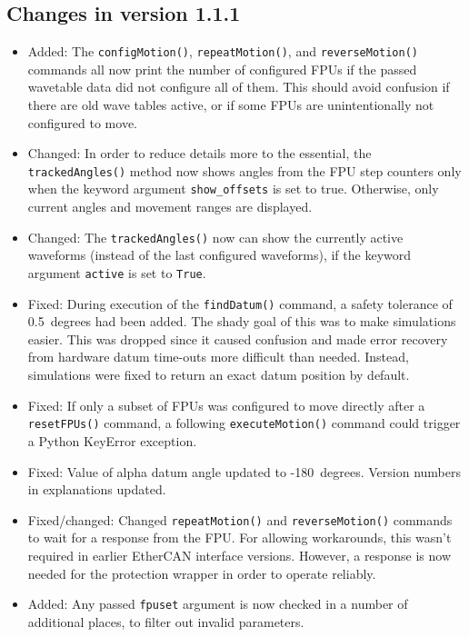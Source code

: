 \documentclass[11pt,a4paper]{report}
\begin{document}
\subsection*{Changes in version 1.1.1}
\begin{itemize}
\item Added: The \texttt{configMotion()}, \texttt{repeatMotion()}, and
  \texttt{reverseMotion()} commands all now print the number of
  configured FPUs if the passed wavetable data did not configure all
  of them. This should avoid confusion if there are old wave tables
  active, or if some FPUs are unintentionally not configured to move.

\item Changed: In order to reduce details more to the essential, the
  \texttt{trackedAngles()} method now shows angles from the FPU step
  counters only when the keyword argument \texttt{show\_offsets} is
  set to true. Otherwise, only current angles and movement ranges are
  displayed.

\item Changed: The \texttt{trackedAngles()} now can show the currently
  active waveforms (instead of the last configured waveforms), if the
  keyword argument \texttt{active} is set to \texttt{True}.
  
\item Fixed: During execution of the \texttt{findDatum()} command, a
  safety tolerance of 0.5\degree\ degrees had been added. The shady goal of
  this was to make simulations easier. This was dropped since it
  caused confusion and made error recovery from hardware datum
  time-outs more difficult than needed. Instead, simulations were
  fixed to return an exact datum position by default.
  
\item Fixed: If only a subset of FPUs was configured to move directly
  after a \texttt{resetFPUs()} command, a following
  \texttt{executeMotion()} command could trigger a Python KeyError
  exception.
  
\item Fixed: Value of alpha datum angle updated to
  -180\degree\ degrees. Version numbers in explanations updated.

\item Fixed/changed: Changed \texttt{repeatMotion()} and
  \texttt{reverseMotion()} commands to wait for a response from the
  FPU. For allowing workarounds, this wasn't required in earlier
  EtherCAN interface versions.  However, a response is now needed for the
  protection wrapper in order to operate reliably.

\item Added: Any passed \texttt{fpuset} argument is now checked in a
  number of additional places, to filter out invalid parameters.
\end{itemize}
\end{document}
